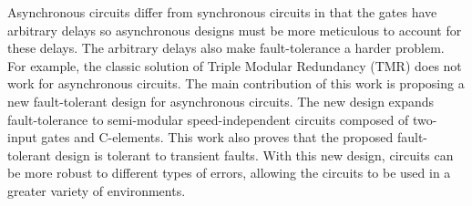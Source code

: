 \documentclass[12pt]{report}
\begin{document}
Asynchronous circuits differ from synchronous circuits in that the gates have arbitrary delays so asynchronous designs must be more meticulous to account for these delays.  The arbitrary delays also make fault-tolerance a harder problem.  For example, the classic solution of Triple Modular Redundancy (TMR) does not work for asynchronous circuits.  The main contribution of this work is proposing a new fault-tolerant design for asynchronous circuits.  The new design expands fault-tolerance to semi-modular speed-independent circuits composed of two-input gates and C-elements.  This work also proves that the proposed fault-tolerant design is tolerant to transient faults.  With this new design, circuits can be more robust to different types of errors, allowing the circuits to be used in a greater variety of environments.




\end{document}
